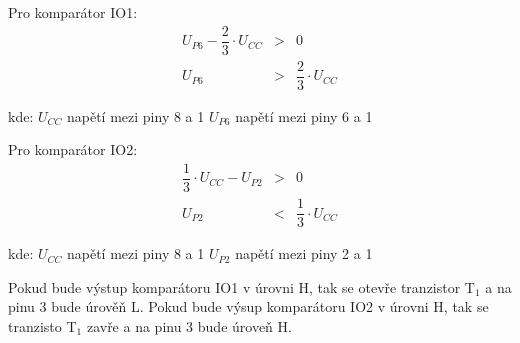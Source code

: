     Pro komparátor IO1:
    \begin{eqnarray}
      U_{P6} - \dfrac{2}{3} \cdot U_{CC} &>& 0 \nonumber\\
      U_{P6} &>& \dfrac{2}{3} \cdot U_{CC}
    \end{eqnarray}
    
    \hspace*{2cm}kde:\newline    
    \hspace*{4cm}$U_{CC}$ \dotfill napětí mezi piny 8 a 1\hspace*{4cm}\newline
    \hspace*{4cm}$U_{P6}$ \dotfill napětí mezi piny 6 a 1\hspace*{4cm}\newline
    
    Pro komparátor IO2:
    \begin{eqnarray}
      \dfrac{1}{3} \cdot U_{CC} - U_{P2} &>& 0 \nonumber\\
      U_{P2} &<& \dfrac{1}{3} \cdot U_{CC}
    \end{eqnarray}
    
    \hspace*{2cm}kde:\newline    
    \hspace*{4cm}$U_{CC}$ \dotfill napětí mezi piny 8 a 1\hspace*{4cm}\newline
    \hspace*{4cm}$U_{P2}$ \dotfill napětí mezi piny 2 a 1\hspace*{4cm}\newline
    
    
    Pokud bude výstup komparátoru IO1 v úrovni H, tak se otevře tranzistor T$_1$ a na pinu 3 bude úrověň L. Pokud bude výsup komparátoru IO2 v úrovni H, tak se tranzisto T$_1$ zavře a na pinu 3 bude úroveň H.
   
  
